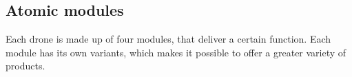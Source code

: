 \documentclass[sigconf,review]{acmart}
\begin{document}

\subsection{Atomic modules}
\label{sec:atomic-modules}

Each drone is made up of four modules, that deliver a certain function. 
Each module has its own variants, which makes it possible to offer a greater variety of products. 

\end{document}
